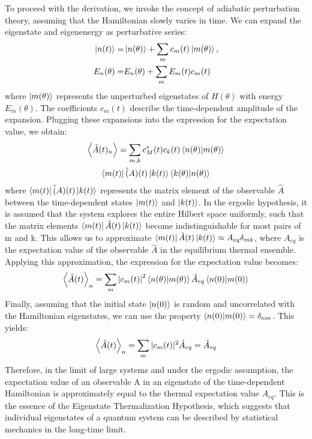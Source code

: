 \documentclass[%
reprint,
superscriptaddress,
amsmath,amssymb,
aps,
prb,
]{revtex4-2}
\begin{document}
To proceed with the derivation, we invoke the concept of adiabatic perturbation theory, assuming that the Hamiltonian slowly varies in time. We can expand the eigenstate and eigenenergy as perturbative series:
\begin{align*}
\ket{n(t)} =& \ket{n(\theta)} + \sum_m c_m(t)\ket{m(\theta)},\\ 
E_n (\theta) =& E_n (\theta) + \sum_m E_m (t) c_m(t)
\end{align*}
where $\ket{m(\theta)}$ represents the unperturbed eigenstates of $H(\theta)$ with energy $E_m(\theta)$. The coefficients $c_m (t)$ describe the time-dependent amplitude of the expansion.
Plugging these expansions into the expression for the expectation value, we obtain:
\begin{multline}
	\expval{\hat{A}(t)_n} 
	= \sum_{m,k} c_M^\ast(t) c_k(t) \bra{n(\theta)}\ket{m(\theta)}\\
	\bra{m(t)}\hat(A)(t)
	\ket{k(t)} \bra{k(\theta)}\ket{n(\theta)}
\end{multline}
where $ \bra{m(t)}\hat(A)(t)\ket{k(t)}$ represents the matrix element of the observable $\hat{A}$ between the time-dependent states $\ket{m(t)}$ and $\ket{k(t)}$.
In the ergodic hypothesis, it is assumed that the system explores the entire Hilbert space uniformly, such that the matrix elements $\bra{m(t)}\hat{A}(t)\ket{k(t)}$ become indistinguishable for most pairs of m and k. This allows us to approximate $\bra{m(t)}\hat{A}(t)\ket{k(t)} \approx A_{eq} \delta_{mk}$, where $A_{eq}$ is the expectation value of the observable $\hat{A}$ in the equilibrium thermal ensemble.
Applying this approximation, the expression for the expectation value becomes:
\begin{equation*}
\expval{\hat{A}(t)}_n = \sum_m \abs{c_m(t)}^2 \bra{n(\theta)}\ket{m(\theta)} \hat{A}_{eq} \bra{n(0)}\ket{m(0)}
\end{equation*}
Finally, assuming that the initial state $\ket{n(0)}$ is random and uncorrelated with the Hamiltonian eigenstates, we can use the property $\bra{n(0)}\ket{m(0)}=\delta_{nm}$. This yields:
\begin{equation*}
\expval{\hat{A}(t)}_n = \sum_m |c_m(t)|^2 \hat{A}_{eq} = \hat{A}_{eq}
\end{equation*}
Therefore, in the limit of large systems and under the ergodic assumption, the expectation value of an observable A in an eigenstate of the time-dependent Hamiltonian is approximately equal to the thermal expectation value $A_{eq}$. This is the essence of the Eigenstate Thermalization Hypothesis, which suggests that individual eigenstates of a quantum system can be described by statistical mechanics in the long-time limit.
	
\end{document}
